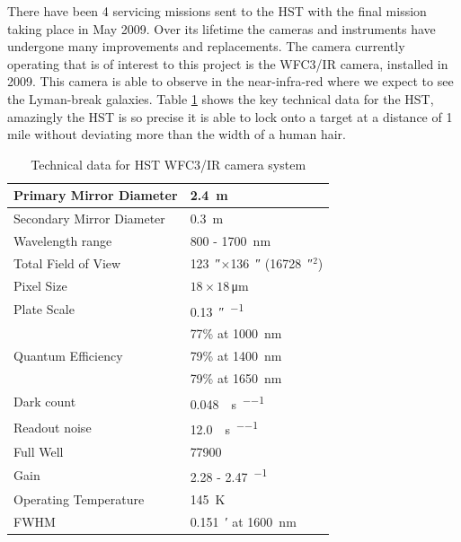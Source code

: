 		There have been 4 servicing missions sent to the HST with the final mission taking place in May 2009. Over its lifetime the cameras and instruments have undergone many improvements and replacements. The camera currently operating that is of interest to this project is the WFC3/IR camera, installed in 2009. This camera is able to observe in the near-infra-red where we expect to see the Lyman-break galaxies. Table \ref{tab:HST_technical} shows the key technical data for the HST, amazingly the HST is so precise it is able to lock onto a target at a distance of 1 mile without deviating more than the width of a human hair.
		\begin{table}[ht]
			\begin{center}
				\begin{tabular}{l|l}
					Primary Mirror Diameter & \SI{2.4}{\metre} \\ \hline
					Secondary Mirror Diameter & \SI{0.3}{\metre} \\ \hline
					Wavelength range & 800 - \SI{1700}{\nano\metre} \\ \hline
					Total Field of View & \SI{123}{\arcsecond}$\times$\SI{136}{\arcsecond} (\SI{16728}{\arcsecond}$^2$) \\ \hline
					Pixel Size & $18\times18$\,\si{\micro\metre} \\ \hline
					Plate Scale & \SI{0.13}{\arcsecond\per\pixel} \\ \hline
					\multirow{3}{*}{Quantum Efficiency} & 77\% at \SI{1000}{\nano\metre}\\
					 & 79\% at \SI{1400}{\nano\metre}\\ 
					 & 79\% at \SI{1650}{\nano\metre}\\ \hline
					Dark count &  \SI{0.048}{\electron\per\second\per\pixel} \\ \hline
					Readout noise & \SI{12.0}{\electron\per\second\per\pixel} \\ \hline
					Full Well & \SI{77900}{\electron} \\ \hline
					Gain & 2.28 - 2.47\si{\electron\per\ADU} \\ \hline
					Operating Temperature & \SI{145}{\kelvin} \\ \hline
					FWHM & \SI{0.151}{\arcminute} at \SI{1600}{\nano\metre} \\
				\end{tabular}
			\end{center}
			\caption{Technical data for HST WFC3/IR camera system\cite{WFC3_IHB}}
			\label{tab:HST_technical}
		\end{table}

